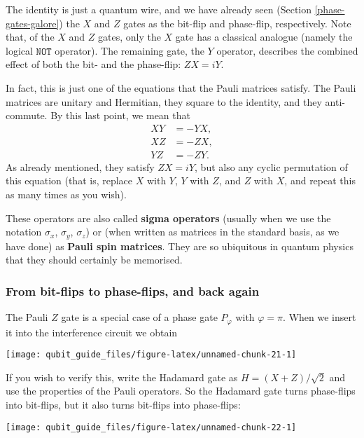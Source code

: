 \documentclass[fleqn]{article}
\begin{document}
The identity is just a quantum wire, and we have already seen (Section \ref{phase-gates-galore}) the \(X\) and \(Z\) gates as the bit-flip and phase-flip, respectively.
Note that, of the \(X\) and \(Z\) gates, only the \(X\) gate has a classical analogue (namely the logical \(\texttt{NOT}\) operator).
The remaining gate, the \(Y\) operator, describes the combined effect of both the bit- and the phase-flip: \(ZX=iY\).

In fact, this is just one of the equations that the Pauli matrices satisfy.
The Pauli matrices are unitary and Hermitian, they square to the identity, and they anti-commute.
By this last point, we mean that
\[
  \begin{aligned}
    XY&=-YX,
  \\XZ&=-ZX,
  \\YZ&=-ZY.
  \end{aligned}
\]
As already mentioned, they satisfy \(ZX=iY\), but also any cyclic permutation of this equation (that is, replace \(X\) with \(Y\), \(Y\) with \(Z\), and \(Z\) with \(X\), and repeat this as many times as you wish).

These operators are also called \textbf{sigma operators} (usually when we use the notation \(\sigma_x\), \(\sigma_y\), \(\sigma_z\)) or (when written as matrices in the standard basis, as we have done) as \textbf{Pauli spin matrices}.
They are so ubiquitous in quantum physics that they should certainly be memorised.

\hypertarget{from-bit-flips-to-phase-flips-and-back-again}{%
\subsubsection{From bit-flips to phase-flips, and back again}\label{from-bit-flips-to-phase-flips-and-back-again}}

The Pauli \(Z\) gate is a special case of a phase gate \(P_\varphi\) with \(\varphi=\pi\).
When we insert it into the interference circuit we obtain

\begin{center}\texttt{[image: qubit\_guide\_files/figure-latex/unnamed-chunk-21-1]} \end{center}

If you wish to verify this, write the Hadamard gate as \(H = (X+Z)/\sqrt{2}\) and use the properties of the Pauli operators.
So the Hadamard gate turns phase-flips into bit-flips, but it also turns bit-flips into phase-flips:

\begin{center}\texttt{[image: qubit\_guide\_files/figure-latex/unnamed-chunk-22-1]} \end{center}
\end{document}
